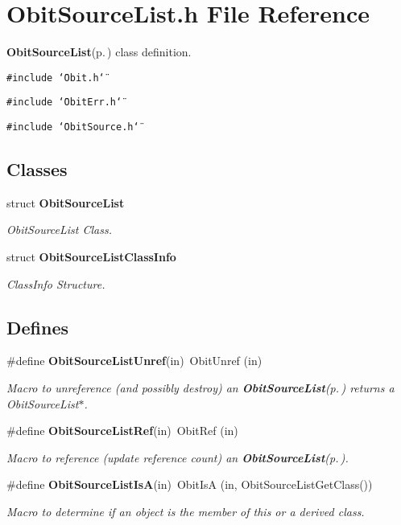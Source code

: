 \section{Obit\-Source\-List.h File Reference}
\label{ObitSourceList_8h}
{\bf Obit\-Source\-List}{\rm (p.\,\pageref{structObitSourceList})} class definition. 

{\tt \#include \char`\"{}Obit.h\char`\"{}}\par
{\tt \#include \char`\"{}Obit\-Err.h\char`\"{}}\par
{\tt \#include \char`\"{}Obit\-Source.h\char`\"{}}\par
\subsection*{Classes}
\begin{CompactItemize}
\item 
struct {\bf Obit\-Source\-List}
\begin{CompactList}\small\item\em Obit\-Source\-List Class. \item\end{CompactList}\item 
struct {\bf Obit\-Source\-List\-Class\-Info}
\begin{CompactList}\small\item\em Class\-Info Structure. \item\end{CompactList}\end{CompactItemize}
\subsection*{Defines}
\begin{CompactItemize}
\item 
\#define {\bf Obit\-Source\-List\-Unref}(in)\ Obit\-Unref (in)
\begin{CompactList}\small\item\em Macro to unreference (and possibly destroy) an {\bf Obit\-Source\-List}{\rm (p.\,\pageref{structObitSourceList})} returns a Obit\-Source\-List$\ast$. \item\end{CompactList}\item 
\#define {\bf Obit\-Source\-List\-Ref}(in)\ Obit\-Ref (in)
\begin{CompactList}\small\item\em Macro to reference (update reference count) an {\bf Obit\-Source\-List}{\rm (p.\,\pageref{structObitSourceList})}. \item\end{CompactList}\item 
\#define {\bf Obit\-Source\-List\-Is\-A}(in)\ Obit\-Is\-A (in, Obit\-Source\-List\-Get\-Class())
\begin{CompactList}\small\item\em Macro to determine if an object is the member of this or a derived class. \item\end{CompactList}\end{CompactItemize}
